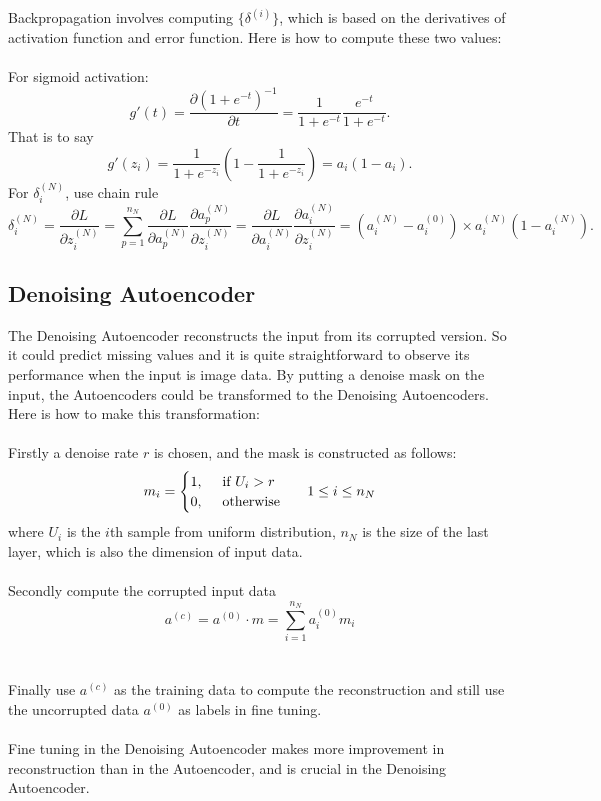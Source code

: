 \documentclass[12pt]{article}
\begin{document}
Backpropagation involves computing $\{\delta^{(i)}\}$, which is based on the derivatives of activation function and error function. Here is how to compute these two values:\\
\\
For sigmoid activation:
\begin{equation}
g'(t) = \frac{\partial{(1+e^{-t})^{-1}}}{\partial{t}} = \frac{1}{1+e^{-t}}\frac{e^{-t}}{1+e^{-t}}.
\end{equation}
That is to say\begin{equation}
g'(z_i) = \frac{1}{1+e^{-z_i}}(1-\frac{1}{1+e^{-z_i}})=a_i(1-a_i).
\end{equation}
For $\delta_i^{(N)}$, use chain rule\begin{equation}
\delta_i^{(N)} = \frac{\partial L}{\partial z^{(N)}_i}=\sum_{p=1}^{n_N} \frac{\partial L}{\partial a^{(N)}_p} \frac{\partial a^{(N)}_p}{\partial z^{(N)}_i} = \frac{\partial L}{\partial a^{(N)}_i} \frac{\partial a^{(N)}_i}{\partial z^{(N)}_i} = (a^{(N)}_i-a^{(0)}_i)\times a^{(N)}_i(1-a^{(N)}_i).
\end{equation}
\subsection{Denoising Autoencoder}
The Denoising Autoencoder reconstructs the input from its corrupted version. So it could predict missing values and it is quite straightforward to observe its performance when the input is image data. By putting a denoise mask on the input, the Autoencoders could be transformed to the Denoising Autoencoders. Here is how to make this transformation:\\
\\
Firstly a denoise rate $r$ is chosen, and the mask is constructed as follows:\begin{equation}
m_i=\begin{cases} 
1,~~~~\text{if }U_i > r\\
0,~~~~\text{otherwise}\\
\end{cases}
~~1\leq i\leq n_N\\
\end{equation}
where $U_i$ is the $i$th sample from uniform distribution, $n_N$ is the size of the last layer, which is also the dimension of input data.\\
\\
Secondly compute the corrupted input data\begin{equation}
a^{(c)} = a^{(0)}\cdot m = \sum_{i=1}^{n_N} a^{(0)}_im_i
\end{equation}\\
\\
Finally use $a^{(c)}$ as the training data to compute the reconstruction and still use the uncorrupted data $a^{(0)}$ as labels in fine tuning.\\
\\
Fine tuning in the Denoising Autoencoder makes more improvement in reconstruction than in the Autoencoder, and is crucial in the Denoising Autoencoder.
\end{document}
